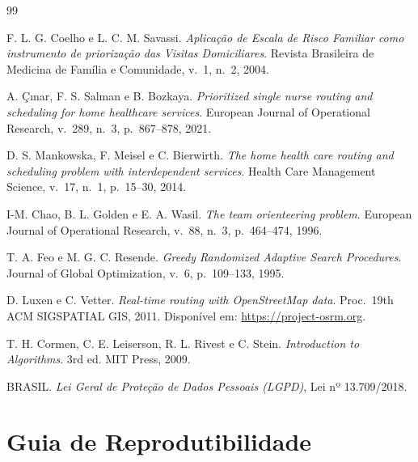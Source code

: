 \documentclass[11pt,a4paper]{article}
\begin{document}
\begin{thebibliography}{99}

F. L. G. Coelho e L. C. M. Savassi.
\textit{Aplicação de Escala de Risco Familiar como instrumento de priorização das Visitas Domiciliares}.
Revista Brasileira de Medicina de Família e Comunidade, v.~1, n.~2, 2004.

A. \c{C}{\i}nar, F. S. Salman e B. Bozkaya.
\textit{Prioritized single nurse routing and scheduling for home healthcare services}.
European Journal of Operational Research, v.~289, n.~3, p.~867--878, 2021.

D. S. Mankowska, F. Meisel e C. Bierwirth.
\textit{The home health care routing and scheduling problem with interdependent services}.
Health Care Management Science, v.~17, n.~1, p.~15--30, 2014.

I-M. Chao, B. L. Golden e E. A. Wasil.
\textit{The team orienteering problem}.
European Journal of Operational Research, v.~88, n.~3, p.~464--474, 1996.

T. A. Feo e M. G. C. Resende.
\textit{Greedy Randomized Adaptive Search Procedures}.
Journal of Global Optimization, v.~6, p.~109--133, 1995.

D. Luxen e C. Vetter.
\textit{Real-time routing with OpenStreetMap data}.
Proc.\ 19th ACM SIGSPATIAL GIS, 2011. Disponível em: \url{https://project-osrm.org}.

T. H. Cormen, C. E. Leiserson, R. L. Rivest e C. Stein.
\textit{Introduction to Algorithms}. 3rd ed. MIT Press, 2009.

BRASIL.
\textit{Lei Geral de Proteção de Dados Pessoais (LGPD)}, Lei nº 13.709/2018.

\end{thebibliography}

\appendix
\section{Guia de Reprodutibilidade}
\label{sec:repro}
\end{document}
